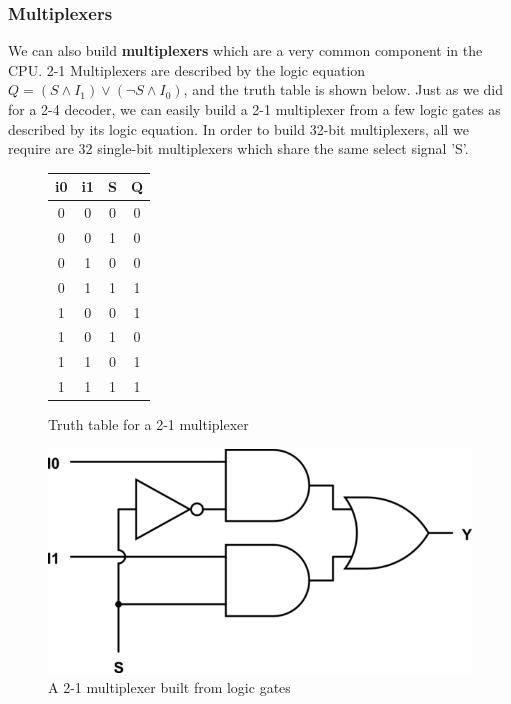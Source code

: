 \documentclass{article}
\begin{document}
	\subsubsection{Multiplexers}
	We can also build \textbf{multiplexers} which are a very common component in the CPU. 2-1 Multiplexers are described by the logic equation $Q = (S \wedge I_{1}) \vee (\neg S \wedge I_{0})$, and the truth table is shown below.	Just as we did for a 2-4 decoder, we can easily build a 2-1 multiplexer from a few logic gates as described by its logic equation. In order to build 32-bit multiplexers, all we require are 32 single-bit multiplexers which share the same select signal 'S'.
	
	\begin{figure}[ht]
		\begin{minipage}[t]{0.45\textwidth}
			\centering
			\begin{tabular}{c c | c | c}
				i0 & i1 & S & Q \\ \hline
				0 & 0 & 0 & 0 \\
				0 & 0 & 1 & 0 \\
				0 & 1 & 0 & 0 \\
				0 & 1 & 1 & 1 \\
				1 & 0 & 0 & 1 \\
				1 & 0 & 1 & 0 \\
				1 & 1 & 0 & 1 \\
				1 & 1 & 1 & 1 \\
			\end{tabular}
			\caption{Truth table for a 2-1 multiplexer}
		\label{fig:2 1 multiplexer}
		\end{minipage}
		\hfill
		\begin{minipage}[t]{0.45\textwidth}
			\includegraphics[width=1\textwidth]{2_1_multiplexer}
			\caption{A 2-1 multiplexer built from logic gates}
			\label{fig:2 1 multiplexer}
		\end{minipage}
	\end{figure}
	
\end{document}
